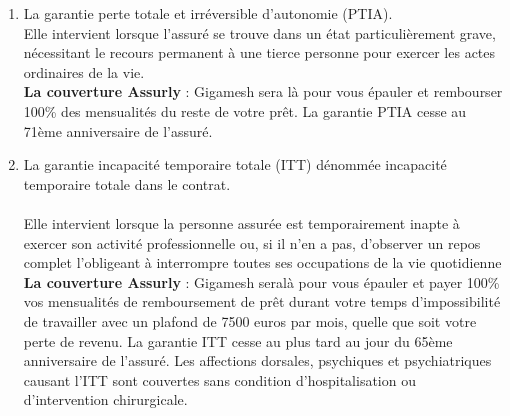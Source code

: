 \begin{enumerate}
	\item La garantie perte totale et irréversible d’autonomie (PTIA).\\
	
Elle intervient lorsque l’assuré se trouve dans un état particulièrement grave, nécessitant le recours permanent à une tierce personne pour exercer les actes ordinaires de la vie.\\

\textbf{La couverture Assurly} : Gigamesh sera là pour vous épauler et rembourser 100\% des mensualités du reste de votre prêt. La garantie PTIA cesse au 71ème anniversaire de l’assuré.

\item La garantie incapacité temporaire totale (ITT) dénommée incapacité temporaire totale dans le contrat.\\\\

Elle intervient lorsque la personne assurée est temporairement inapte à exercer son activité professionnelle ou, si il n’en a pas, d’observer un repos complet l’obligeant à interrompre toutes ses occupations de la vie
quotidienne\\

\textbf{La couverture Assurly} : Gigamesh seralà pour vous épauler et payer 100\% vos mensualités de remboursement de prêt durant votre temps d’impossibilité de travailler avec un plafond de 7500 euros par mois, quelle que soit votre perte de revenu. La garantie ITT cesse au plus tard au jour du 65ème anniversaire de l’assuré. Les affections dorsales, psychiques et psychiatriques causant l’ITT sont couvertes sans condition d’hospitalisation
ou d’intervention chirurgicale.
\end{enumerate}
